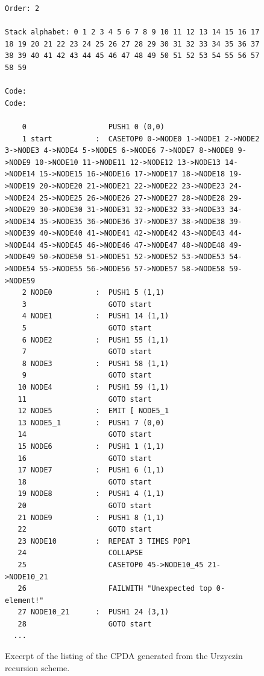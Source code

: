 \begin{figure}
\begin{lstlisting}[breaklines=true,basicstyle=\tiny]
Order: 2

Stack alphabet: 0 1 2 3 4 5 6 7 8 9 10 11 12 13 14 15 16 17 18 19 20 21 22 23 24 25 26 27 28 29 30 31 32 33 34 35 36 37 38 39 40 41 42 43 44 45 46 47 48 49 50 51 52 53 54 55 56 57 58 59

Code:
Code:

    0                   PUSH1 0 (0,0)
    1 start          :  CASETOP0 0->NODE0 1->NODE1 2->NODE2 3->NODE3 4->NODE4 5->NODE5 6->NODE6 7->NODE7 8->NODE8 9->NODE9 10->NODE10 11->NODE11 12->NODE12 13->NODE13 14->NODE14 15->NODE15 16->NODE16 17->NODE17 18->NODE18 19->NODE19 20->NODE20 21->NODE21 22->NODE22 23->NODE23 24->NODE24 25->NODE25 26->NODE26 27->NODE27 28->NODE28 29->NODE29 30->NODE30 31->NODE31 32->NODE32 33->NODE33 34->NODE34 35->NODE35 36->NODE36 37->NODE37 38->NODE38 39->NODE39 40->NODE40 41->NODE41 42->NODE42 43->NODE43 44->NODE44 45->NODE45 46->NODE46 47->NODE47 48->NODE48 49->NODE49 50->NODE50 51->NODE51 52->NODE52 53->NODE53 54->NODE54 55->NODE55 56->NODE56 57->NODE57 58->NODE58 59->NODE59
    2 NODE0          :  PUSH1 5 (1,1)
    3                   GOTO start
    4 NODE1          :  PUSH1 14 (1,1)
    5                   GOTO start
    6 NODE2          :  PUSH1 55 (1,1)
    7                   GOTO start
    8 NODE3          :  PUSH1 58 (1,1)
    9                   GOTO start
   10 NODE4          :  PUSH1 59 (1,1)
   11                   GOTO start
   12 NODE5          :  EMIT [ NODE5_1
   13 NODE5_1        :  PUSH1 7 (0,0)
   14                   GOTO start
   15 NODE6          :  PUSH1 1 (1,1)
   16                   GOTO start
   17 NODE7          :  PUSH1 6 (1,1)
   18                   GOTO start
   19 NODE8          :  PUSH1 4 (1,1)
   20                   GOTO start
   21 NODE9          :  PUSH1 8 (1,1)
   22                   GOTO start
   23 NODE10         :  REPEAT 3 TIMES POP1
   24                   COLLAPSE
   25                   CASETOP0 45->NODE10_45 21->NODE10_21
   26                   FAILWITH "Unexpected top 0-element!"
   27 NODE10_21      :  PUSH1 24 (3,1)
   28                   GOTO start
  ...
\end{lstlisting}
\label{fig:cpda_listing}
\caption{Excerpt of the listing of the CPDA generated  from the Urzyczin recursion scheme.}
\end{figure}


